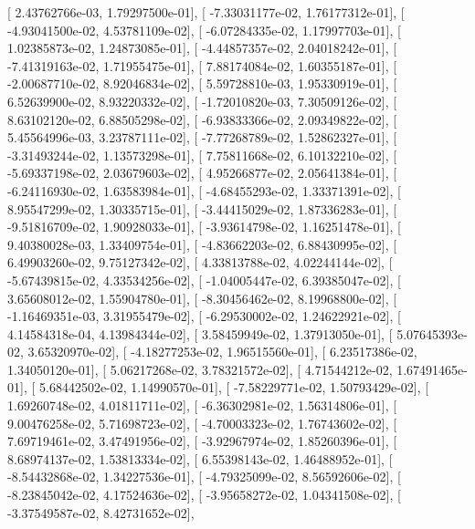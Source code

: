 \documentclass{article}
\begin{document}
       [  2.43762766e-03,   1.79297500e-01],
       [ -7.33031177e-02,   1.76177312e-01],
       [ -4.93041500e-02,   4.53781109e-02],
       [ -6.07284335e-02,   1.17997703e-01],
       [  1.02385873e-02,   1.24873085e-01],
       [ -4.44857357e-02,   2.04018242e-01],
       [ -7.41319163e-02,   1.71955475e-01],
       [  7.88174084e-02,   1.60355187e-01],
       [ -2.00687710e-02,   8.92046834e-02],
       [  5.59728810e-03,   1.95330919e-01],
       [  6.52639900e-02,   8.93220332e-02],
       [ -1.72010820e-03,   7.30509126e-02],
       [  8.63102120e-02,   6.88505298e-02],
       [ -6.93833366e-02,   2.09349822e-02],
       [  5.45564996e-03,   3.23787111e-02],
       [ -7.77268789e-02,   1.52862327e-01],
       [ -3.31493244e-02,   1.13573298e-01],
       [  7.75811668e-02,   6.10132210e-02],
       [ -5.69337198e-02,   2.03679603e-02],
       [  4.95266877e-02,   2.05641384e-01],
       [ -6.24116930e-02,   1.63583984e-01],
       [ -4.68455293e-02,   1.33371391e-02],
       [  8.95547299e-02,   1.30335715e-01],
       [ -3.44415029e-02,   1.87336283e-01],
       [ -9.51816709e-02,   1.90928033e-01],
       [ -3.93614798e-02,   1.16251478e-01],
       [  9.40380028e-03,   1.33409754e-01],
       [ -4.83662203e-02,   6.88430995e-02],
       [  6.49903260e-02,   9.75127342e-02],
       [  4.33813788e-02,   4.02244144e-02],
       [ -5.67439815e-02,   4.33534256e-02],
       [ -1.04005447e-02,   6.39385047e-02],
       [  3.65608012e-02,   1.55904780e-01],
       [ -8.30456462e-02,   8.19968800e-02],
       [ -1.16469351e-03,   3.31955479e-02],
       [ -6.29530002e-02,   1.24622921e-02],
       [  4.14584318e-04,   4.13984344e-02],
       [  3.58459949e-02,   1.37913050e-01],
       [  5.07645393e-02,   3.65320970e-02],
       [ -4.18277253e-02,   1.96515560e-01],
       [  6.23517386e-02,   1.34050120e-01],
       [  5.06217268e-02,   3.78321572e-02],
       [  4.71544212e-02,   1.67491465e-01],
       [  5.68442502e-02,   1.14990570e-01],
       [ -7.58229771e-02,   1.50793429e-02],
       [  1.69260748e-02,   4.01811711e-02],
       [ -6.36302981e-02,   1.56314806e-01],
       [  9.00476258e-02,   5.71698723e-02],
       [ -4.70003323e-02,   1.76743602e-02],
       [  7.69719461e-02,   3.47491956e-02],
       [ -3.92967974e-02,   1.85260396e-01],
       [  8.68974137e-02,   1.53813334e-02],
       [  6.55398143e-02,   1.46488952e-01],
       [ -8.54432868e-02,   1.34227536e-01],
       [ -4.79325099e-02,   8.56592606e-02],
       [ -8.23845042e-02,   4.17524636e-02],
       [ -3.95658272e-02,   1.04341508e-02],
       [ -3.37549587e-02,   8.42731652e-02],
\end{document}
